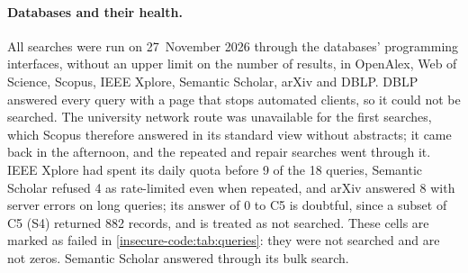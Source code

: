 \paragraph{Databases and their health.}
All searches were run on 27~November 2026 through the databases' programming
interfaces, without an upper limit on the number of results, in
OpenAlex, Web of Science, Scopus, IEEE Xplore, Semantic Scholar, arXiv and
DBLP.
DBLP answered every query with a page that stops automated clients, so it
could not be searched.
The university network route was unavailable for the first searches, which
Scopus therefore answered in its standard view without abstracts; it came
back in the afternoon, and the repeated and repair searches went through it.
IEEE Xplore had spent its daily quota before 9 of the 18 queries, Semantic
Scholar refused 4 as rate-limited even when repeated, and arXiv answered 8
with server errors on long queries; its answer of 0 to C5 is doubtful,
since a subset of C5 (S4) returned 882 records, and is treated as not
searched.
These cells are marked as failed in \cref{insecure-code:tab:queries}: they
were not searched and are not zeros.
Semantic Scholar answered through its bulk search.

